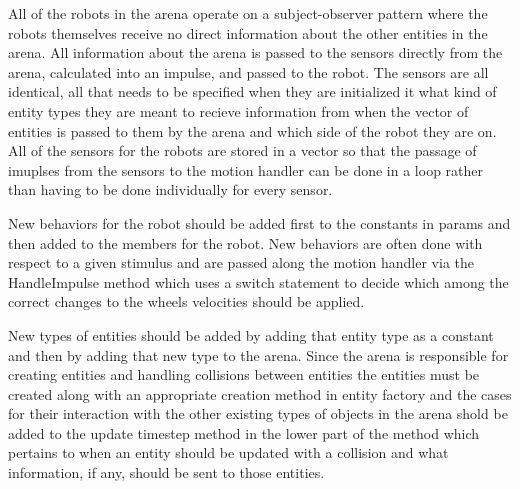 All of the robots in the arena operate on a subject-\/observer pattern where the robots themselves receive no direct information about the other entities in the arena. All information about the arena is passed to the sensors directly from the arena, calculated into an impulse, and passed to the robot. The sensors are all identical, all that needs to be specified when they are initialized it what kind of entity types they are meant to recieve information from when the vector of entities is passed to them by the arena and which side of the robot they are on. All of the sensors for the robots are stored in a vector so that the passage of imuplses from the sensors to the motion handler can be done in a loop rather than having to be done individually for every sensor.

New behaviors for the robot should be added first to the constants in params and then added to the members for the robot. New behaviors are often done with respect to a given stimulus and are passed along the motion handler via the Handle\+Impulse method which uses a switch statement to decide which among the correct changes to the wheels\textquotesingle{} velocities should be applied.

New types of entities should be added by adding that entity type as a constant and then by adding that new type to the arena. Since the arena is responsible for creating entities and handling collisions between entities the entities must be created along with an appropriate creation method in entity factory and the cases for their interaction with the other existing types of objects in the arena shold be added to the update timestep method in the lower part of the method which pertains to when an entity should be updated with a collision and what information, if any, should be sent to those entities. 